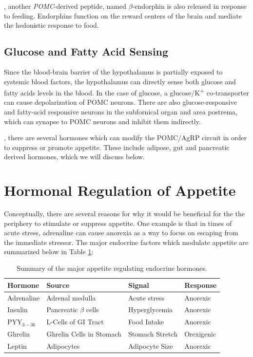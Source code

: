 \documentclass{tufte-handout}
\begin{document}
, another \textit{POMC}-derived peptide, named $\beta$-endorphin is also released in response to feeding.  Endorphins function on the reward centers of the brain and mediate the hedonistic response to food.

\subsection{Glucose and Fatty Acid Sensing}

Since the blood-brain barrier of the hypothalamus is partially exposed to systemic blood factors, the hypothalamus can directly sense both glucose and fatty acids levels in the blood.  In the case of glucose, a glucose/K\textsuperscript{+} co-transporter can cause depolarization of POMC neurons\cite{Parton2007}.  There are also glucose-responsive and fatty-acid responsive neurons in the subfornical organ and area postrema, which can synapse to POMC neurons and inhibit them indirectly.

, there are several hormones which can modify the POMC/AgRP circuit in order to suppress or promote appetite.  These include adipose, gut and pancreatic derived hormones, which we will discuss below.

\section{Hormonal Regulation of Appetite}

Conceptually, there are several reasons for why it would be beneficial for the the periphery to stimulate or suppress appetite.  One example is that in times of acute stress, adrenaline can cause anorexia\cite{RUSSEK1962} as a way to focus on escaping from the immediate stressor.  The major endocrine factors which modulate appetite are summarized below in Table \ref{tab:appetite-hormones}:

\begin{table}
  \centering
  \begin{tabular}{llll}
    \toprule
    Hormone & Source & Signal & Response \\
    \midrule
    Adrenaline & Adrenal medulla & Acute stress & Anorexic \\
    Insulin & Pancreatic $\beta$ cells & Hyperglycemia & Anorexic \\
    PYY$_{3-36}$ & L-Cells of GI Tract & Food Intake & Anorexic \\
    Ghrelin & Ghrelin Cells in Stomach & Stomach Stretch & Orexigenic \\
    Leptin & Adipocytes & Adipocyte Size & Anorexic \\
    \bottomrule
  \end{tabular}
  \caption{Summary of the major appetite regulating endocrine hormones.}
  \label{tab:appetite-hormones}
\end{table}
\end{document}
